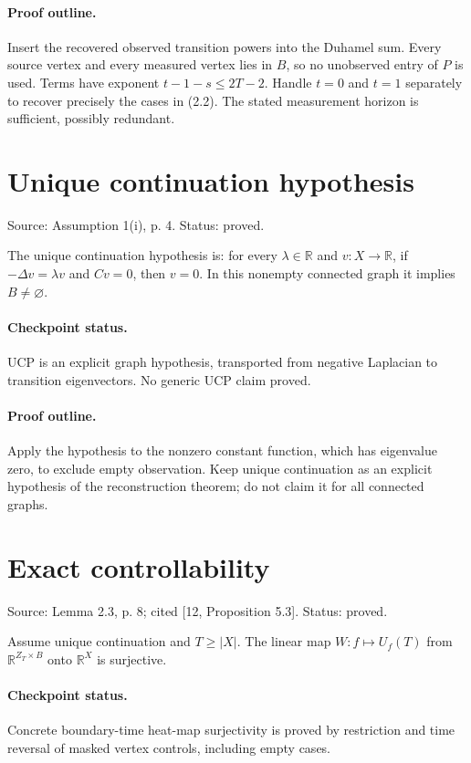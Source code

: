 \paragraph{Proof outline.}

Insert the recovered observed transition powers into the Duhamel sum. Every source vertex and every measured vertex lies in $B$, so no unobserved entry of $P$ is used. Terms have exponent $t-1-s\leq2T-2$. Handle $t=0$ and $t=1$ separately to recover precisely the cases in (2.2). The stated measurement horizon is sufficient, possibly redundant.
\nodebreak
\section{Unique continuation hypothesis}
Source: Assumption 1(i), p. 4. Status: proved.
\begin{definition}\label{ucp}

The unique continuation hypothesis is: for every $\lambda\in\mathbb R$ and $v:X\to\mathbb R$, if $-\Delta v=\lambda v$ and $Cv=0$, then $v=0$. In this nonempty connected graph it implies $B\ne\varnothing$.


\paragraph{Checkpoint status.}
UCP is an explicit graph hypothesis, transported from negative Laplacian to transition eigenvectors. No generic UCP claim proved.
\end{definition}
\paragraph{Proof outline.}

Apply the hypothesis to the nonzero constant function, which has eigenvalue zero, to exclude empty observation. Keep unique continuation as an explicit hypothesis of the reconstruction theorem; do not claim it for all connected graphs.
\nodebreak
\section{Exact controllability}
Source: Lemma 2.3, p. 8; cited [12, Proposition 5.3]. Status: proved.
\begin{lemma}\label{controllability}

Assume unique continuation and $T\geq|X|$. The linear map $W:f\mapsto U_f(T)$ from $\mathbb R^{Z_T\times B}$ onto $\mathbb R^X$ is surjective.


\paragraph{Checkpoint status.}
Concrete boundary-time heat-map surjectivity is proved by restriction and time reversal of masked vertex controls, including empty cases.
\end{lemma}
